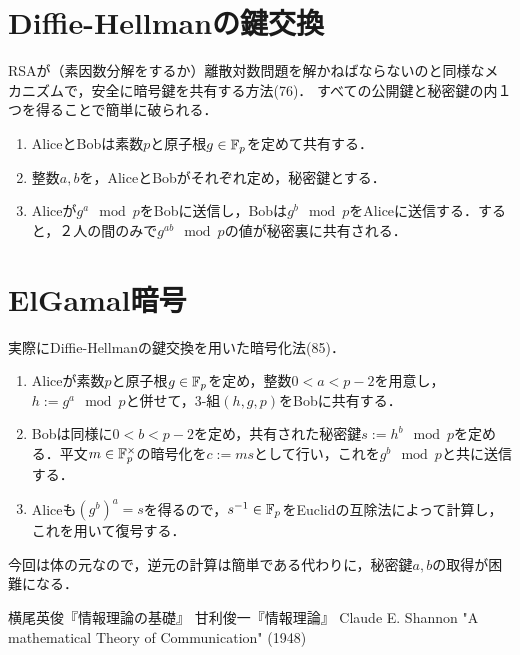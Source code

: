 \documentclass[uplatex,dvipdfmx]{jsreport}
\begin{document}
\section{Diffie-Hellmanの鍵交換}

\begin{tcolorbox}[colframe=ForestGreen, colback=ForestGreen!10!white,breakable,colbacktitle=ForestGreen!40!white,coltitle=black,fonttitle=\bfseries\sffamily,
title=]
    RSAが（素因数分解をするか）離散対数問題を解かねばならないのと同様なメカニズムで，安全に暗号鍵を共有する方法(76)．
    すべての公開鍵と秘密鍵の内１つを得ることで簡単に破られる．
\end{tcolorbox}

\begin{definition}\mbox{}
    \begin{enumerate}
        \item AliceとBobは素数$p$と原子根$g\in\mathbb{F}_p$を定めて共有する．
        \item 整数$a,b$を，AliceとBobがそれぞれ定め，秘密鍵とする．
        \item Aliceが$g^a\mod p$をBobに送信し，Bobは$g^b\mod p$をAliceに送信する．すると，２人の間のみで$g^{ab}\mod p$の値が秘密裏に共有される．
    \end{enumerate}
\end{definition}

\section{ElGamal暗号}

\begin{tcolorbox}[colframe=ForestGreen, colback=ForestGreen!10!white,breakable,colbacktitle=ForestGreen!40!white,coltitle=black,fonttitle=\bfseries\sffamily,
title=]
    実際にDiffie-Hellmanの鍵交換を用いた暗号化法(85)．
\end{tcolorbox}

\begin{definition}\mbox{}
    \begin{enumerate}
        \item Aliceが素数$p$と原子根$g\in\mathbb{F}_p$を定め，整数$0<a<p-2$を用意し，$h:=g^a\mod p$と併せて，3-組$(h,g,p)$をBobに共有する．
        \item Bobは同様に$0<b<p-2$を定め，共有された秘密鍵$s:=h^b\mod p$を定める．平文$m\in\mathbb{F}^\times_p$の暗号化を$c:=ms$として行い，これを$g^b\mod p$と共に送信する．
        \item Aliceも$(g^b)^a=s$を得るので，$s^{-1}\in\mathbb{F}_p$をEuclidの互除法によって計算し，これを用いて復号する．
    \end{enumerate}
\end{definition}
\begin{remarks}
    今回は体の元なので，逆元の計算は簡単である代わりに，秘密鍵$a,b$の取得が困難になる．
\end{remarks}

\begin{thebibliography}{9}
    横尾英俊『情報理論の基礎』
    甘利俊一『情報理論』
    Claude E. Shannon "A mathematical Theory of Communication" (1948)
\end{thebibliography}
\end{document}
